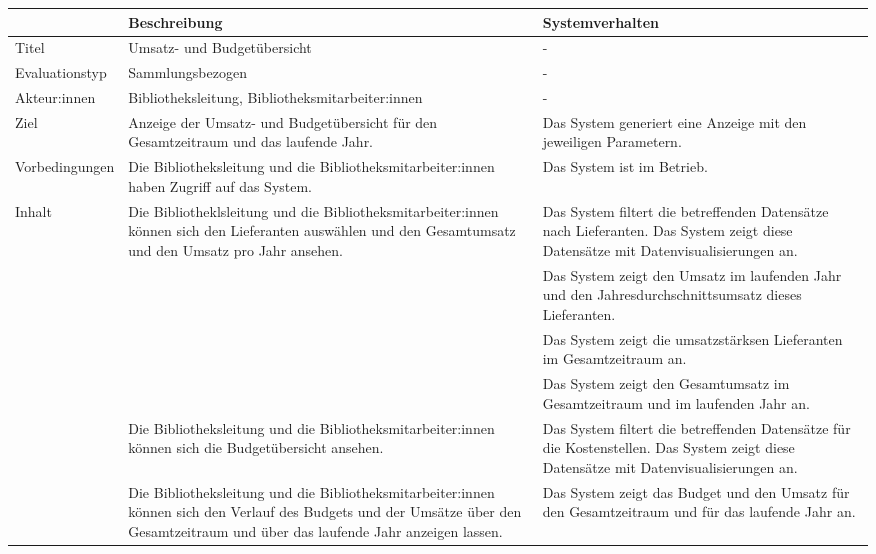 \begingroup
\setlength{\tabcolsep}{9pt} %
\renewcommand{\arraystretch}{1.10} 
\begin{table}[h]
    \centering
    \begin{adjustbox}{max width=\textwidth}
    \begin{tabular}{lp{7.0cm}p{7.0cm}}
       \toprule
       \textbf{}          & \textbf{Beschreibung} &\textbf{Systemverhalten}\\
       \midrule
        Titel                            &Umsatz- und Budgetübersicht& -\\
        Evaluationstyp                   &Sammlungsbezogen                   & -\\
        Akteur:innen                     &Bibliotheksleitung, Bibliotheksmitarbeiter:innen& -\\
        Ziel                             &Anzeige der Umsatz- und Budgetübersicht für den Gesamtzeitraum und das laufende Jahr.& Das System generiert eine Anzeige mit den jeweiligen Parametern.\\
        Vorbedingungen                   &Die Bibliotheksleitung und die Bibliotheksmitarbeiter:innen haben Zugriff auf das System.& Das System ist im Betrieb.\\
        Inhalt                           &Die Bibliotheklsleitung und die Bibliotheksmitarbeiter:innen können sich den Lieferanten auswählen und den Gesamtumsatz und den Umsatz pro Jahr ansehen.& Das System filtert die betreffenden Datensätze nach Lieferanten. Das System zeigt diese Datensätze mit Datenvisualisierungen an.\\
                                        & &Das System zeigt den Umsatz im laufenden Jahr und den Jahresdurchschnittsumsatz dieses Lieferanten.\\
                                        & &Das System zeigt die umsatzstärksen Lieferanten im Gesamtzeitraum an.\\
                                        & &Das System zeigt den Gesamtumsatz im Gesamtzeitraum und im laufenden Jahr an.\\
                                         &Die Bibliotheksleitung und die Bibliotheksmitarbeiter:innen können sich die Budgetübersicht ansehen. &Das System filtert die betreffenden Datensätze für die Kostenstellen. Das System zeigt diese Datensätze mit Datenvisualisierungen an.\\
                                         &Die Bibliotheksleitung und die Bibliotheksmitarbeiter:innen können sich den Verlauf des Budgets und der Umsätze über den Gesamtzeitraum und über das laufende Jahr anzeigen lassen. &Das System zeigt das Budget und den Umsatz für den Gesamtzeitraum und für das laufende Jahr an.\\

\end{tabular}
\end{adjustbox}
\end{table}
